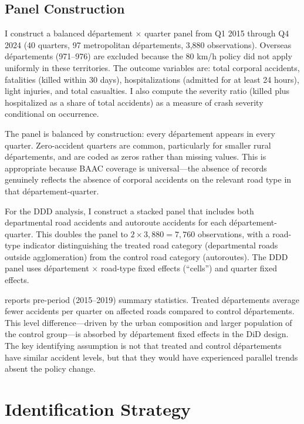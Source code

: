 \documentclass[12pt]{article}
\begin{document}
\subsection{Panel Construction}

I construct a balanced d\'{e}partement $\times$ quarter panel from Q1 2015 through Q4 2024 (40 quarters, 97 metropolitan d\'{e}partements, 3,880 observations). Overseas d\'{e}partements (971--976) are excluded because the 80 km/h policy did not apply uniformly in these territories. The outcome variables are: total corporal accidents, fatalities (killed within 30 days), hospitalizations (admitted for at least 24 hours), light injuries, and total casualties. I also compute the severity ratio (killed plus hospitalized as a share of total accidents) as a measure of crash severity conditional on occurrence.

The panel is balanced by construction: every d\'{e}partement appears in every quarter. Zero-accident quarters are common, particularly for smaller rural d\'{e}partements, and are coded as zeros rather than missing values. This is appropriate because BAAC coverage is universal---the absence of records genuinely reflects the absence of corporal accidents on the relevant road type in that d\'{e}partement-quarter.

For the DDD analysis, I construct a stacked panel that includes both departmental road accidents and autoroute accidents for each d\'{e}partement-quarter. This doubles the panel to $2 \times 3{,}880 = 7{,}760$ observations, with a road-type indicator distinguishing the treated road category (departmental roads outside agglomeration) from the control road category (autoroutes). The DDD panel uses d\'{e}partement $\times$ road-type fixed effects (``cells'') and quarter fixed effects.

 reports pre-period (2015--2019) summary statistics. Treated d\'{e}partements average fewer accidents per quarter on affected roads compared to control d\'{e}partements. This level difference---driven by the urban composition and larger population of the control group---is absorbed by d\'{e}partement fixed effects in the DiD design. The key identifying assumption is not that treated and control d\'{e}partements have similar accident levels, but that they would have experienced parallel trends absent the policy change.


\section{Identification Strategy} \label{sec:design}
\end{document}
